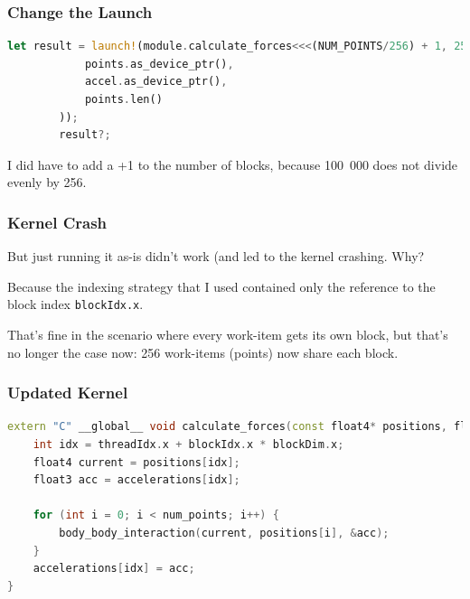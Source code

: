 \begin{frame}[fragile]
\frametitle{Change the Launch}

\begin{lstlisting}[language=Rust]
        let result = launch!(module.calculate_forces<<<(NUM_POINTS/256) + 1, 256, 0, stream>>>(
            points.as_device_ptr(),
            accel.as_device_ptr(),
            points.len()
        ));
        result?;
\end{lstlisting}

I did have to add a +1 to the number of blocks, because 100~000 does not divide evenly by 256.

\end{frame}


\begin{frame}
\frametitle{Kernel Crash}

 But just running it as-is didn't work (and led to the kernel crashing. Why? 
 
 Because the indexing strategy that I used contained only the reference to the block index \texttt{blockIdx.x}. 
 
 That's fine in the scenario where every work-item gets its own block, but that's no longer the case now: 256 work-items (points) now share each block.


\end{frame}


\begin{frame}[fragile]
\frametitle{Updated Kernel}

\begin{lstlisting}[language=C++]
extern "C" __global__ void calculate_forces(const float4* positions, float3* accelerations, int num_points) {
    int idx = threadIdx.x + blockIdx.x * blockDim.x;
    float4 current = positions[idx];
    float3 acc = accelerations[idx];

    for (int i = 0; i < num_points; i++) {
        body_body_interaction(current, positions[i], &acc);
    }
    accelerations[idx] = acc;
}
\end{lstlisting}

\end{frame}


